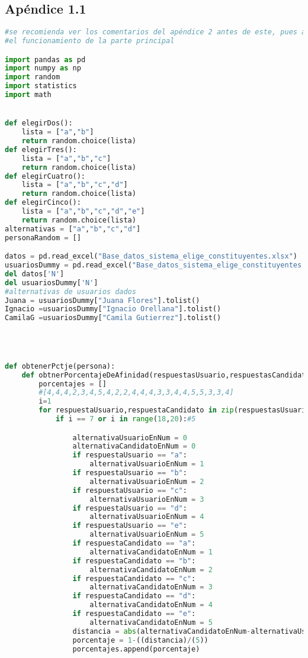 \documentclass[a4paper]{article}
\begin{document}
\subsection{Apéndice 1.1}
\begin{lstlisting}[language=Python]
#se recomienda ver los comentarios del apéndice 2 antes de este, pues allí se explica
#el funcionamiento de la parte principal

import pandas as pd
import numpy as np
import random
import statistics
import math


def elegirDos():
    lista = ["a","b"]
    return random.choice(lista)
def elegirTres():
    lista = ["a","b","c"]
    return random.choice(lista)
def elegirCuatro():
    lista = ["a","b","c","d"]
    return random.choice(lista)
def elegirCinco():
    lista = ["a","b","c","d","e"]
    return random.choice(lista)
alternativas = ["a","b","c","d"]
personaRandom = []

datos = pd.read_excel("Base_datos_sistema_elige_constituyentes.xlsx")
usuariosDummy = pd.read_excel("Base_datos_sistema_elige_constituyentes.xlsx", sheet_name = "Respuestas usuariosas")
del datos['N']
del usuariosDummy['N']
#alternativas de usuarios dados
Juana = usuariosDummy["Juana Flores"].tolist()
Ignacio =usuariosDummy["Ignacio Orellana"].tolist()
CamilaG =usuariosDummy["Camila Gutierrez"].tolist()




def obtenerPctje(persona):
    def obtnerPorcentajeDeAfinidad(respuestasUsuario,respuestasCandidato):
        porcentajes = []
        #[4,4,4,2,3,4,5,4,2,2,4,4,4,3,3,4,4,5,5,3,3,4]
        i=1
        for respuestaUsuario,respuestaCandidato in zip(respuestasUsuario,respuestasCandidato):
            if i == 7 or i in range(18,20):#5

                alternativaUsuarioEnNum = 0
                alternativaCandidatoEnNum = 0
                if respuestaUsuario == "a":
                    alternativaUsuarioEnNum = 1
                if respuestaUsuario == "b":
                    alternativaUsuarioEnNum = 2
                if respuestaUsuario == "c":
                    alternativaUsuarioEnNum = 3
                if respuestaUsuario == "d":
                    alternativaUsuarioEnNum = 4
                if respuestaUsuario == "e":
                    alternativaUsuarioEnNum = 5
                if respuestaCandidato == "a":
                    alternativaCandidatoEnNum = 1
                if respuestaCandidato == "b":
                    alternativaCandidatoEnNum = 2
                if respuestaCandidato == "c":
                    alternativaCandidatoEnNum = 3
                if respuestaCandidato == "d":
                    alternativaCandidatoEnNum = 4
                if respuestaCandidato == "e":
                    alternativaCandidatoEnNum = 5
                distancia = abs(alternativaCandidatoEnNum-alternativaUsuarioEnNum)
                porcentaje = 1-((distancia)/(5))
                porcentajes.append(porcentaje)


\end{lstlisting}
\end{document}
